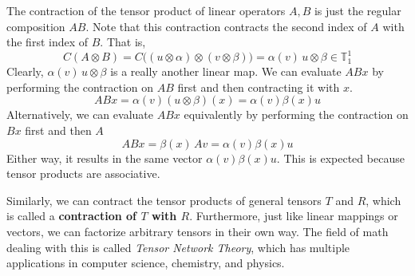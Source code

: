   \begin{theorem}
    The contraction of the tensor product of linear operators $A, B$ is just the regular composition $A B$. Note that this contraction contracts the second index of $A$ with the first index of $B$. That is, 
    \[C(A \otimes B) = C\big( (u \otimes \alpha) \otimes (v \otimes \beta) \big) = \alpha(v) \, u \otimes \beta \in \mathbb{T}^1_1\]
    Clearly, $\alpha(v) \, u \otimes \beta$ is a really another linear map. We can evaluate $A B x$ by performing the contraction on $A B$ first and then contracting it with $x$. 
    \[A B x = \alpha (v) (u \otimes \beta) (x) = \alpha (v) \beta(x) u \]
    Alternatively, we can evaluate $A B x$ equivalently by performing the contraction on $B x$ first and then $A$ 
    \[A B x = \beta (x)\, A v = \alpha(v) \beta(x) u\]
    Either way, it results in the same vector $\alpha (v) \beta (x) u$. This is expected because tensor products are associative. 
  \end{theorem}

  Similarly, we can contract the tensor products of general tensors $T$ and $R$, which is called a \textbf{contraction of $T$ with $R$}. Furthermore, just like linear mappings or vectors, we can factorize arbitrary tensors in their own way. The field of math dealing with this is called \textit{Tensor Network Theory}, which has multiple applications in computer science, chemistry, and physics. 

